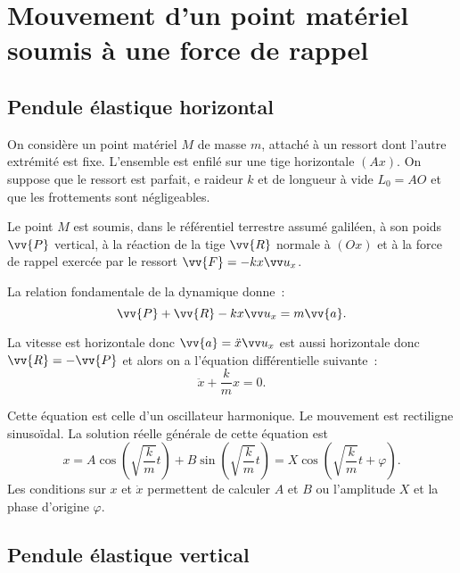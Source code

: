 \section{Mouvement d'un point matériel soumis à une force de rappel}
\label{chap3-sec:mouvementdunpointmaterielsoumisauneforcederappel}


\subsection{Pendule élastique horizontal}
\label{chap3-subsec:pendulehorizontal}

On considère un point matériel $M$ de masse $m$, attaché à un ressort dont l'autre extrémité est fixe. L'ensemble est enfilé sur une tige horizontale $(Ax)$. On suppose que le ressort est parfait, e raideur $k$ et de longueur à vide $L_0=AO$ et que les frottements sont négligeables.

Le point $M$ est soumis, dans le référentiel terrestre assumé galiléen, à son poids $\vv{P}$ vertical, à la réaction de la tige $\vv{R}$ normale à $(Ox)$ et à la force de rappel exercée par le ressort $\vv{F}=-kx\ux$.

La relation fondamentale de la dynamique donne~:
\begin{equation}
  \vv{P}+\vv{R}-kx\ux = m\vv{a}.
\end{equation}

La vitesse est horizontale donc $\vv{a} = \ddot{x}\ux$ est aussi horizontale donc $\vv{R}=-\vv{P}$ et alors on a l'équation différentielle suivante~:
\begin{equation}
  \ddot{x} +\frac{k}{m}x=0.
\end{equation}

Cette équation est celle d'un oscillateur harmonique. Le mouvement est rectiligne sinusoïdal. La solution réelle générale de cette équation est
\begin{equation}
  x = A \cos\left(\sqrt{\frac{k}{m}} t\right) + B \sin\left(\sqrt{\frac{k}{m}} t\right) = X \cos\left(\sqrt{\frac{k}{m}} t + \varphi\right).
\end{equation}
Les conditions sur $x$ et $\dot{x}$ permettent de calculer $A$ et $B$ ou l'amplitude $X$ et la phase d'origine $\varphi$.

\subsection{Pendule élastique vertical}
\label{chap3-subsec:pendulevertical}

